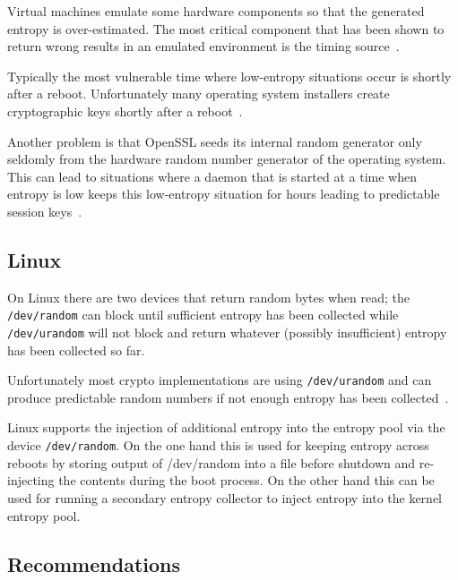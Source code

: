 Virtual machines emulate some hardware components so that the
generated entropy is over-estimated. The most critical component that
has been shown to return wrong results in an emulated environment is the
timing source~\cite{Eng11,POL11}.

Typically the most vulnerable time where low-entropy situations occur is
shortly after a reboot. Unfortunately many operating system installers
create cryptographic keys shortly after a reboot~\cite{HDWH12}.

Another problem is that OpenSSL seeds its internal random generator only
seldomly from the hardware random number generator of the operating
system. This can lead to situations where a daemon that is started at a
time when entropy is low keeps this low-entropy situation for hours
leading to predictable session keys~\cite{HDWH12}.

\subsection{Linux}


On Linux there are two devices that return random bytes when read; the
\verb+/dev/random+ can block until sufficient entropy has been collected
while \verb+/dev/urandom+ will not block and return whatever (possibly
insufficient) entropy has been collected so far.

Unfortunately most crypto implementations are using \verb+/dev/urandom+
and can produce predictable random numbers if not enough entropy has
been collected~\cite{HDWH12}.

Linux supports the injection of additional entropy into the entropy pool
via the device \verb+/dev/random+. On the one hand this is used for
keeping entropy across reboots by storing output of /dev/random into a
file before shutdown and re-injecting the contents during the boot
process. On the other hand this can be used for running a secondary
entropy collector to inject entropy into the kernel entropy pool.



\subsection{Recommendations}

